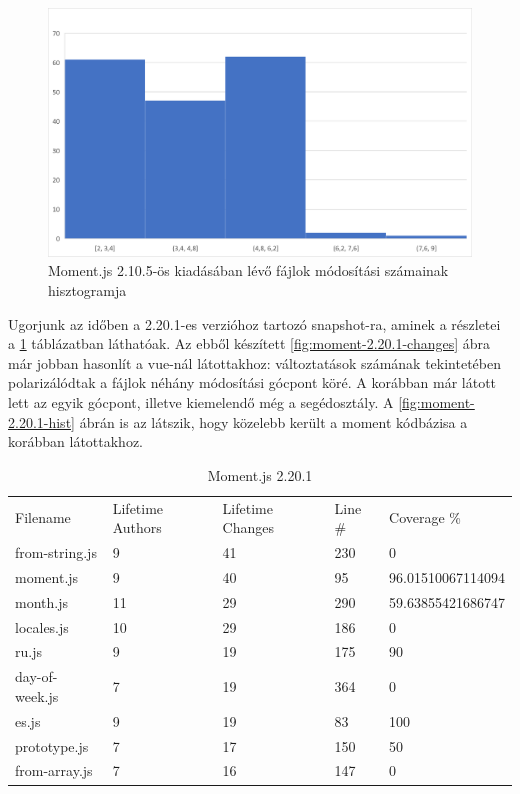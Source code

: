 \begin{figure}[H]
    \centering
    \includegraphics[width=1\textwidth]{images/moment/moment-2.10.5-hist.png}
    \caption{Moment.js 2.10.5-ös kiadásában lévő fájlok módosítási számainak hisztogramja}
    \label{fig:moment-2.10.1-hist}
\end{figure}

Ugorjunk az időben a 2.20.1-es verzióhoz tartozó snapshot-ra, aminek a részletei a \ref{tab:moment-2.20.1} táblázatban láthatóak. Az ebből készített \ref{fig:moment-2.20.1-changes} ábra már jobban hasonlít a vue-nál látottakhoz: változtatások számának tekintetében polarizálódtak a fájlok néhány módosítási gócpont köré. A korábban már látott  lett az egyik gócpont, illetve kiemelendő még a  segédosztály. A \ref{fig:moment-2.20.1-hist} ábrán is az látszik, hogy közelebb került a moment kódbázisa a korábban látottakhoz.

\begin{table}[h]
    \centering
    \begin{tabular}{l|l|l|l|l}
        Filename       & Lifetime Authors & Lifetime Changes & Line \# & Coverage \%       \\
        from-string.js & 9                & 41               & 230     & 0                 \\
        moment.js      & 9                & 40               & 95      & 96.01510067114094 \\
        month.js       & 11               & 29               & 290     & 59.63855421686747 \\
        locales.js     & 10               & 29               & 186     & 0                 \\
        ru.js          & 9                & 19               & 175     & 90                \\
        day-of-week.js & 7                & 19               & 364     & 0                 \\
        es.js          & 9                & 19               & 83      & 100               \\
        prototype.js   & 7                & 17               & 150     & 50                \\
        from-array.js  & 7                & 16               & 147     & 0
    \end{tabular}
    \caption{Moment.js 2.20.1}
    \label{tab:moment-2.20.1}
\end{table}

